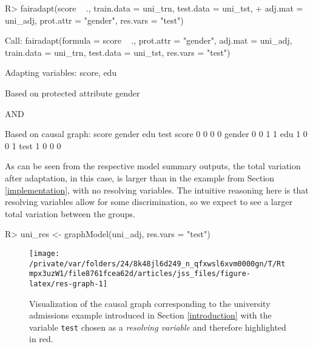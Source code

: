 \documentclass[
  nojss]{jss}
\begin{document}
\begin{CodeChunk}
\begin{CodeInput}
R> fairadapt(score ~ ., train.data = uni_trn, test.data = uni_tst,
+           adj.mat = uni_adj, prot.attr = "gender", res.vars = "test")
\end{CodeInput}
\begin{CodeOutput}

Call:
fairadapt(formula = score ~ ., prot.attr = "gender", adj.mat = uni_adj, 
    train.data = uni_trn, test.data = uni_tst, res.vars = "test")


Adapting variables:
  score, edu

Based on protected attribute gender 

  AND

Based on causal graph:
       score gender edu test
score      0      0   0    0
gender     0      0   1    1
edu        1      0   0    1
test       1      0   0    0
\end{CodeOutput}
\end{CodeChunk}

As can be seen from the respective model summary outputs, the total
variation after adaptation, in this case, is larger than in the example
from Section \ref{implementation}, with no resolving variables. The
intuitive reasoning here is that resolving variables allow for some
discrimination, so we expect to see a larger total variation between the
groups.

\begin{CodeChunk}
\begin{CodeInput}
R> uni_res <- graphModel(uni_adj, res.vars = "test")
\end{CodeInput}
\end{CodeChunk}

\begin{CodeChunk}
\begin{figure}

{\centering \texttt{[image: /private/var/folders/24/8k48jl6d249\_n\_qfxwsl6xvm0000gn/T/Rtmpx3uzW1/file8761fcea62d/articles/jss\_files/figure-latex/res-graph-1]} 

}

\caption[Visualization of the causal graph corresponding to the university admissions example introduced in Section \ref{introduction} with the variable \texttt{test} chosen as a \textit{resolving variable} and therefore highlighted in red]{Visualization of the causal graph corresponding to the university admissions example introduced in Section \ref{introduction} with the variable \texttt{test} chosen as a \textit{resolving variable} and therefore highlighted in red.}\label{fig:res-graph}
\end{figure}
\end{CodeChunk}
\end{document}
